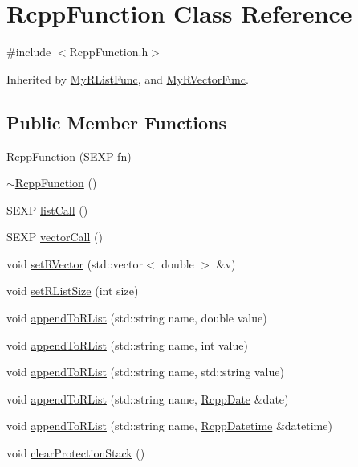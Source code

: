 \hypertarget{classRcppFunction}{
\section{RcppFunction Class Reference}
\label{classRcppFunction}
}


{\ttfamily \#include $<$RcppFunction.h$>$}

Inherited by \hyperlink{classMyRListFunc}{MyRListFunc}, and \hyperlink{classMyRVectorFunc}{MyRVectorFunc}.\subsection*{Public Member Functions}
\begin{DoxyCompactItemize}
\item 
\hyperlink{classRcppFunction_a6fc6fca8d052170d86240c784f54261a}{RcppFunction} (SEXP \hyperlink{classRcppFunction_aa6b5966224b8b7d158be6cdfc3612063}{fn})
\item 
\hyperlink{classRcppFunction_ae155cf5dd33cb110e9a89a59c7bff6e9}{$\sim$RcppFunction} ()
\item 
SEXP \hyperlink{classRcppFunction_a0cc9d29ab7db552494dddefaa78e6578}{listCall} ()
\item 
SEXP \hyperlink{classRcppFunction_ac57c514c761609892ff553434e134446}{vectorCall} ()
\item 
void \hyperlink{classRcppFunction_a482df5aa5e2a98d52c9a79cf3ab31c67}{setRVector} (std::vector$<$ double $>$ \&v)
\item 
void \hyperlink{classRcppFunction_af3dbcf8dcfbdfc49ef566b5efd0ad978}{setRListSize} (int size)
\item 
void \hyperlink{classRcppFunction_a0df1a8ff093e21a2a7c6fc80d6645c7e}{appendToRList} (std::string name, double value)
\item 
void \hyperlink{classRcppFunction_afce449ac5d89b32e0e0b9f584278a672}{appendToRList} (std::string name, int value)
\item 
void \hyperlink{classRcppFunction_a861ba7ae5c09acf31a034472b5a47728}{appendToRList} (std::string name, std::string value)
\item 
void \hyperlink{classRcppFunction_a9aab0b3accb81d90fb813acf3bf4c49d}{appendToRList} (std::string name, \hyperlink{classRcppDate}{RcppDate} \&date)
\item 
void \hyperlink{classRcppFunction_a0be4ab064287c2d3a5c3b883a1707d70}{appendToRList} (std::string name, \hyperlink{classRcppDatetime}{RcppDatetime} \&datetime)
\item 
void \hyperlink{classRcppFunction_a689c914636f0f0e86b90da4425c6e6a3}{clearProtectionStack} ()
\end{DoxyCompactItemize}
